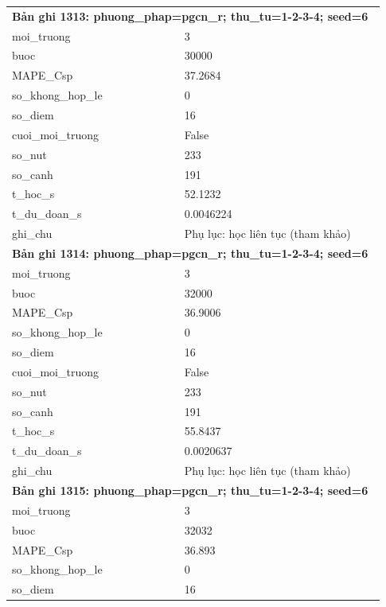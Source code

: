 \begin{longtable}{p{0.43\linewidth}p{0.50\linewidth}}
\midrule
\multicolumn{2}{p{0.95\linewidth}}{\textbf{Bản ghi 1313: phuong\_phap=pgcn\_r; thu\_tu=1-2-3-4; seed=6}} \\
moi\_\allowbreak truong & 3 \\
buoc & 30000 \\
MAPE\_\allowbreak Csp & 37.2684 \\
so\_\allowbreak khong\_\allowbreak hop\_\allowbreak le & 0 \\
so\_\allowbreak diem & 16 \\
cuoi\_\allowbreak moi\_\allowbreak truong & False \\
so\_\allowbreak nut & 233 \\
so\_\allowbreak canh & 191 \\
t\_\allowbreak hoc\_\allowbreak s & 52.1232 \\
t\_\allowbreak du\_\allowbreak doan\_\allowbreak s & 0.0046224 \\
ghi\_\allowbreak chu & Phụ lục: học liên tục (tham khảo) \\
\midrule
\multicolumn{2}{p{0.95\linewidth}}{\textbf{Bản ghi 1314: phuong\_phap=pgcn\_r; thu\_tu=1-2-3-4; seed=6}} \\
moi\_\allowbreak truong & 3 \\
buoc & 32000 \\
MAPE\_\allowbreak Csp & 36.9006 \\
so\_\allowbreak khong\_\allowbreak hop\_\allowbreak le & 0 \\
so\_\allowbreak diem & 16 \\
cuoi\_\allowbreak moi\_\allowbreak truong & False \\
so\_\allowbreak nut & 233 \\
so\_\allowbreak canh & 191 \\
t\_\allowbreak hoc\_\allowbreak s & 55.8437 \\
t\_\allowbreak du\_\allowbreak doan\_\allowbreak s & 0.0020637 \\
ghi\_\allowbreak chu & Phụ lục: học liên tục (tham khảo) \\
\midrule
\multicolumn{2}{p{0.95\linewidth}}{\textbf{Bản ghi 1315: phuong\_phap=pgcn\_r; thu\_tu=1-2-3-4; seed=6}} \\
moi\_\allowbreak truong & 3 \\
buoc & 32032 \\
MAPE\_\allowbreak Csp & 36.893 \\
so\_\allowbreak khong\_\allowbreak hop\_\allowbreak le & 0 \\
so\_\allowbreak diem & 16 \\

\end{longtable}
